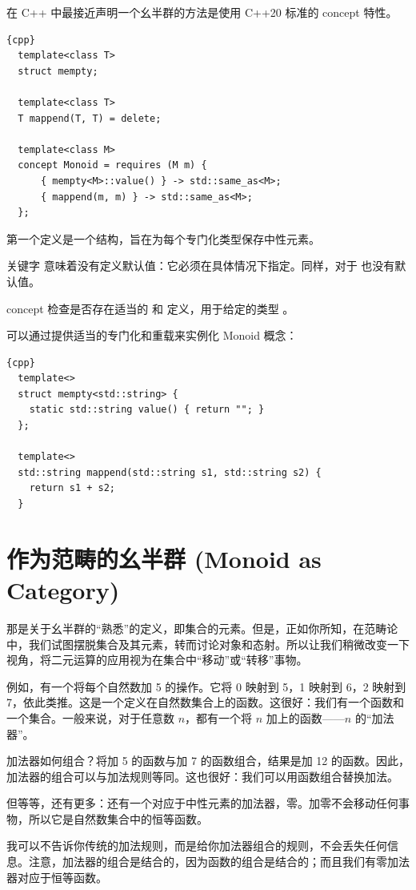 在 C++ 中最接近声明一个幺半群的方法是使用 C++20 标准的 concept 特性。

\begin{lstlisting}{cpp}
  template<class T>
  struct mempty;

  template<class T>
  T mappend(T, T) = delete;

  template<class M>
  concept Monoid = requires (M m) {
      { mempty<M>::value() } -> std::same_as<M>;
      { mappend(m, m) } -> std::same_as<M>;
  };
\end{lstlisting}
第一个定义是一个结构，旨在为每个专门化类型保存中性元素。

关键字  意味着没有定义默认值：它必须在具体情况下指定。同样，对于  也没有默认值。

concept  检查是否存在适当的  和  定义，用于给定的类型 。

可以通过提供适当的专门化和重载来实例化 Monoid 概念：

\begin{lstlisting}{cpp}
  template<>
  struct mempty<std::string> {
    static std::string value() { return ""; }
  };

  template<>
  std::string mappend(std::string s1, std::string s2) {
    return s1 + s2;
  }
\end{lstlisting}

\section{作为范畴的幺半群 (Monoid as Category)}

那是关于幺半群的“熟悉”的定义，即集合的元素。但是，正如你所知，在范畴论中，我们试图摆脱集合及其元素，转而讨论对象和态射。所以让我们稍微改变一下视角，将二元运算的应用视为在集合中“移动”或“转移”事物。

例如，有一个将每个自然数加 5 的操作。它将 0 映射到 5，1 映射到 6，2 映射到 7，依此类推。这是一个定义在自然数集合上的函数。这很好：我们有一个函数和一个集合。一般来说，对于任意数 $n$，都有一个将 $n$ 加上的函数——$n$ 的“加法器”。

加法器如何组合？将加 5 的函数与加 7 的函数组合，结果是加 12 的函数。因此，加法器的组合可以与加法规则等同。这也很好：我们可以用函数组合替换加法。

但等等，还有更多：还有一个对应于中性元素的加法器，零。加零不会移动任何事物，所以它是自然数集合中的恒等函数。

我可以不告诉你传统的加法规则，而是给你加法器组合的规则，不会丢失任何信息。注意，加法器的组合是结合的，因为函数的组合是结合的；而且我们有零加法器对应于恒等函数。


